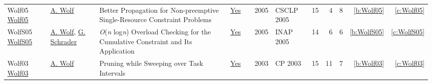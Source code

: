 {\begin{longtable}{>{\raggedright\arraybackslash}p{3cm}>{\raggedright\arraybackslash}p{6cm}>{\raggedright\arraybackslash}p{6.5cm}rrrp{2.5cm}rrrrr}
Wolf05 \href{http://dx.doi.org/10.1007/11402763_15}{Wolf05} & \hyperref[auth:a51]{A. Wolf} & Better Propagation for Non-preemptive Single-Resource Constraint Problems & \href{works/Wolf05.pdf}{Yes} & \cite{Wolf05} & 2005 & CSCLP 2005 & 15 & 4 & 8 & \ref{b:Wolf05} & \ref{c:Wolf05}\\
WolfS05 \href{https://doi.org/10.1007/11963578\_8}{WolfS05} & \hyperref[auth:a51]{A. Wolf}, \hyperref[auth:a720]{G. Schrader} & \emph{O}(\emph{n} log\emph{n}) Overload Checking for the Cumulative Constraint and Its Application & \href{works/WolfS05.pdf}{Yes} & \cite{WolfS05} & 2005 & INAP 2005 & 14 & 6 & 6 & \ref{b:WolfS05} & \ref{c:WolfS05}\\
Wolf03 \href{https://doi.org/10.1007/978-3-540-45193-8\_50}{Wolf03} & \hyperref[auth:a51]{A. Wolf} & Pruning while Sweeping over Task Intervals & \href{works/Wolf03.pdf}{Yes} & \cite{Wolf03} & 2003 & CP 2003 & 15 & 11 & 7 & \ref{b:Wolf03} & \ref{c:Wolf03}\\
\end{longtable}
}

